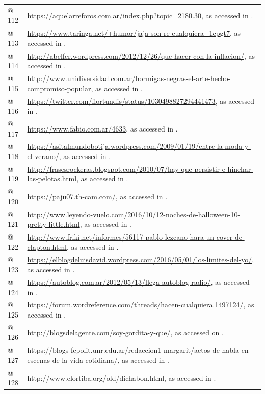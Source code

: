 \begin{tabularx}{\textwidth}{XX}
@ 112 & \url{https://aquelarreforos.com.ar/index.php?topic=2180.30}, as accessed in \citealt{December2020}.\\
@ 113 & \url{https://www.taringa.net/+humor/jaja-son-re-cualquiera_1cpgt7}, as accessed in \citealt{June2021}.\\
@ 114 & \url{http://abelfer.wordpress.com/2012/12/26/que-hacer-con-la-inflacion/}, as accessed in \citealt{November2020}.\\
@ 115 & \url{http://www.unidiversidad.com.ar/hormigas-negras-el-arte-hecho-compromiso-popular}, as accessed in \citealt{November2020}.\\
@ 116 & \url{https://twitter.com/flortundis/status/1030498827294441473}, as accessed in \citealt{June2021}.\\
@ 117 & \url{https://www.fabio.com.ar/4633}, as accessed in \citealt{November2020}.\\
@ 118 & \url{https://asitalmundobotija.wordpress.com/2009/01/19/entre-la-moda-y-el-verano/}, as accessed in \citealt{November2020}.\\
@ 119 & \url{http://frasesrockeras.blogspot.com/2010/07/hay-que-persistir-e-hinchar-las-pelotas.html}, as accessed in \citealt{November2020}.\\
@ 120 & \url{https://paju07.th-cam.com/}, as accessed in \citealt{November2020}.\\
@ 121 & \url{http://www.leyendo-vuelo.com/2016/10/12-noches-de-halloween-10-pretty-little.html}, as accessed in \citealt{November2020}.\\
@ 122 & \url{http://www.friki.net/informes/56117-pablo-lezcano-hara-un-cover-de-clapton.html}, as accessed in \citealt{November2020}.\\
@ 123 & \url{https://elblogdeluisdavid.wordpress.com/2016/05/01/los-limites-del-yo/}, as accessed in \citealt{November2020}.\\
@ 124 & \url{https://autoblog.com.ar/2012/05/13/llega-autoblog-radio/}, as accessed in \citealt{November2020}.\\
@ 125 & \url{https://forum.wordreference.com/threads/hacen-cualquiera.1497124/}, as accessed in \citealt{November2020}.\\
@ 126 & http://blogsdelagente.com/soy-gordita-y-que/, as accessed on \citealt{March2017}.\\
@ 127 & https://blogs-fcpolit.unr.edu.ar/redaccion1-margarit/actos-de-habla-en-escenas-de-la-vida-cotidiana/, as accessed in \citealt{November2020}.\\
@ 128 & http://www.elortiba.org/old/dichabon.html, as accessed in \citealt{November2020}.\\

\end{tabularx}
